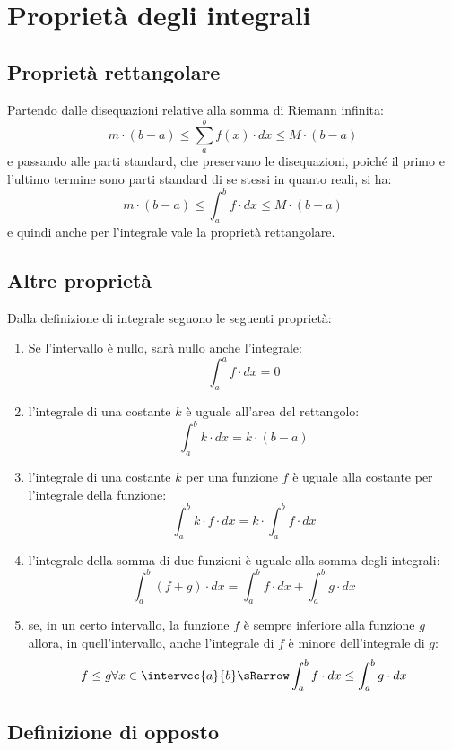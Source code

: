 \section{Proprietà degli integrali}
\label{sec:integrali_proprieta}

\subsection{Proprietà rettangolare}
\label{subsec:integrali_proprieta_rettangolare}

Partendo dalle disequazioni relative alla somma di Riemann infinita:
\[m \cdot (b - a) \le  \sum_a^b f(x) \cdot dx  \le M\cdot(b - a)\]
e passando alle parti standard, che 
preservano le disequazioni, poiché il primo e l'ultimo termine sono parti 
standard di se stessi in quanto reali, si ha: 
\[m \cdot(b - a) \le  \int_a^b f \cdot dx  \le M\cdot(b - a)\] 
e quindi anche per l'integrale vale la proprietà rettangolare.

\subsection{Altre proprietà }
\label{subsec:integrali_altre_proprieta}

Dalla definizione di integrale seguono le seguenti proprietà:
\begin{enumerate}
 \item Se l'intervallo è nullo, sarà nullo anche l'integrale:
\[\int_a^a f \cdot dx=0\] 
 \item l'integrale di una costante \(k\) è uguale all'area del rettangolo:
\[\int_a^b k \cdot dx = k \cdot (b-a)\]
 \item l'integrale di una costante \(k\) per una funzione \(f\) è uguale alla 
costante per l'integrale della funzione:
\[\int_a^b k \cdot f \cdot dx = k\cdot\int_a^b f \cdot dx\]
 \item l'integrale della somma di due funzioni è uguale alla somma degli 
integrali:
\[\int_a^b (f+g)\cdot dx = \int_a^b f \cdot dx + \int_a^b g\cdot dx\]
 \item se, in un certo intervallo, la funzione \(f\) è sempre inferiore alla 
funzione \(g\) allora, in quell'intervallo, anche l'integrale di \(f\) è 
minore dell'integrale di \(g\):
\[f \le g \forall x \in \intervcc{a}{b} \sRarrow 
\int_a^b f \cdot dx \le \int_a^b g\cdot dx\]
\end{enumerate}

\subsection{Definizione di opposto}
\label{subsec:integrali_opposto}

